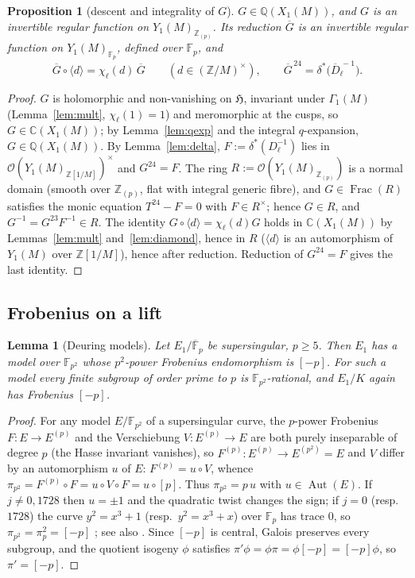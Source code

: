 \documentclass[11pt,a4paper]{article}
\numberwithin{equation}{section}
\newtheorem{proposition}[theorem]{Proposition}
\newtheorem{lemma}[theorem]{Lemma}
\theoremstyle{definition}
\theoremstyle{remark}
\newcommand{\Fp}{\mathbb F_p}
\newcommand{\Fq}{\mathbb F_{p^2}}
\newcommand{\Fb}{\overline{\mathbb F}_p}
\newcommand{\Z}{\mathbb Z}
\newcommand{\Q}{\mathbb Q}
\newcommand{\Aut}{\operatorname{Aut}}
\begin{document}
\begin{proposition}[descent and integrality of $G$]\label{prop:Gint}
$G\in\Q(X_1(M))$, and $G$ is an invertible regular function on $Y_1(M)_{\Z_{(p)}}$. Its reduction
$\overline G$ is an invertible regular function on $Y_1(M)_{\Fp}$, defined over $\Fp$, and
\[
\overline G\circ\langle d\rangle=\chi_\ell(d)\,\overline G\qquad(d\in(\Z/M)^\times),\qquad
\overline G^{\,24}=\delta^*\bigl(\overline D_\ell^{\,-1}\bigr).
\]
\end{proposition}
\begin{proof}
$G$ is holomorphic and non-vanishing on $\mathfrak H$, invariant under $\Gamma_1(M)$
(Lemma~\ref{lem:mult}, $\chi_\ell(1)=1$) and meromorphic at the cusps, so $G\in\mathbb C(X_1(M))$;
by Lemma~\ref{lem:qexp} and the integral $q$-expansion, $G\in\Q(X_1(M))$. By
Lemma~\ref{lem:delta}, $F:=\delta^*(D_\ell^{-1})$ lies in $\mathcal O(Y_1(M)_{\Z[1/M]})^\times$ and
$G^{24}=F$. The ring $R:=\mathcal O(Y_1(M)_{\Z_{(p)}})$ is a normal domain (smooth over $\Z_{(p)}$,
flat with integral generic fibre), and $G\in\operatorname{Frac}(R)$ satisfies the monic equation
$T^{24}-F=0$ with $F\in R^\times$; hence $G\in R$, and $G^{-1}=G^{23}F^{-1}\in R$. The identity
$G\circ\langle d\rangle=\chi_\ell(d)G$ holds in $\mathbb C(X_1(M))$ by Lemmas~\ref{lem:mult}
and~\ref{lem:diamond}, hence in $R$ ($\langle d\rangle$ is an automorphism of $Y_1(M)$ over
$\Z[1/M]$), hence after reduction. Reduction of $G^{24}=F$ gives the last identity.
\end{proof}

\subsection{Frobenius on a lift}

\begin{lemma}[Deuring models]\label{lem:deuring}
Let $E_1/\Fb$ be supersingular, $p\ge5$. Then $E_1$ has a model over $\Fq$ whose $p^2$-power
Frobenius endomorphism is $[-p]$. For such a model every finite subgroup of order prime to $p$ is
$\Fq$-rational, and $E_1/K$ again has Frobenius $[-p]$.
\end{lemma}
\begin{proof}
For any model $E/\Fq$ of a supersingular curve, the $p$-power Frobenius $F:E\to E^{(p)}$ and the
Verschiebung $V:E^{(p)}\to E$ are both purely inseparable of degree $p$ (the Hasse invariant
vanishes), so $F^{(p)}:E^{(p)}\to E^{(p^2)}=E$ and $V$ differ by an automorphism $u$ of $E$:
$F^{(p)}=u\circ V$, whence $\pi_{p^2}=F^{(p)}\circ F=u\circ V\circ F=u\circ[p]$. Thus
$\pi_{p^2}=p\,u$ with $u\in\Aut(E)$. If $j\ne0,1728$ then $u=\pm1$ and the quadratic twist changes
the sign; if $j=0$ (resp.\ $1728$) the curve $y^2=x^3+1$ (resp.\ $y^2=x^3+x$) over $\Fp$ has
trace $0$, so $\pi_{p^2}=\pi_p^2=[-p]$ \citep{Deuring41,Waterhouse69}; see also
\citet[Lemma~4.3]{Ono25}. Since $[-p]$ is central, Galois preserves every subgroup, and the quotient
isogeny $\phi$ satisfies $\pi'\phi=\phi\pi=\phi[-p]=[-p]\phi$, so $\pi'=[-p]$.
\end{proof}
\end{document}
